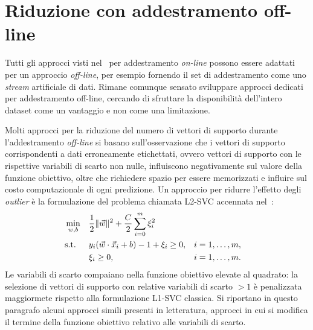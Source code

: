 \section{Riduzione con addestramento off-line}\label{sec:sparsesmv:off-line}
Tutti gli approcci visti nel~ per addestramento \emph{on-line} possono essere adattati per un approccio \emph{off-line}, per esempio fornendo il set di addestramento come uno \emph{stream} artificiale di dati.
Rimane comunque sensato sviluppare approcci dedicati per addestramento off-line, cercando di sfruttare la disponibilità dell'intero dataset come un vantaggio e non come una limitazione.

Molti approcci per la riduzione del numero di vettori di supporto durante l'addestramento \emph{off-line} si basano sull'osservazione che i vettori di supporto corrispondenti a dati erroneamente etichettati, ovvero vettori di supporto con le rispettive variabili di scarto non nulle, influiscono negativamente sul valore della funzione obiettivo, oltre che richiedere spazio per essere memorizzati e influire sul costo computazionale di ogni predizione. 
Un approccio per ridurre l'effetto degli \emph{outlier} è la formulazione del problema chiamata L2-SVC accennata nel~:
\begin{equation}
\label{eq:l2svc}
\begin{aligned}
& \min_{w,b}    && \frac{1}{2}\|\Vec{w}\|^2 + \frac{C}{2}\sum_{i=0}^{m} \xi_i^2 \\
& \textrm{s.t.} && y_i(\Vec{w}\cdot \Vec{x}_i + b) - 1 + \xi_i \geq 0, && i=1,\dots,m, \\
&               && \xi_i \geq 0,  && i=1,\dots,m.
\end{aligned}
\end{equation}
Le variabili di scarto compaiano nella funzione obiettivo elevate al quadrato: 
la selezione di vettori di supporto con relative variabili di scarto $>1$ è penalizzata maggiormete rispetto alla formulazione L1-SVC classica.
Si riportano in questo paragrafo alcuni approcci simili presenti in letteratura, approcci in cui si modifica il termine della funzione obiettivo relativo alle variabili di scarto.

